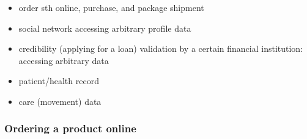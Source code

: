 \documentclass[12pt,english,a4paper,titlepage,cleardoublepage=empty,dottedtoc]{report}
\providecommand{\tightlist}{%
  \setlength{\itemsep}{0pt}\setlength{\parskip}{0pt}}
\begin{document}
\begin{itemize}
\tightlist
\item
  order sth online, purchase, and package shipment
\item
  social network accessing arbitrary profile data
\item
  credibility (applying for a loan) validation by a certain financial
  institution: accessing arbitrary data
\item
  patient/health record
\item
  care (movement) data
\end{itemize}

\subsubsection{Ordering a product
online}\label{ordering-a-product-online}
\end{document}
